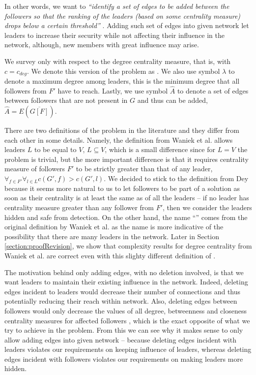 In other words, we want to \emph{``identify a set of edges to be added between the followers so that
the ranking of the leaders (based on some centrality measure) drops below a certain threshold''} \cite{Waniek2017}.
Adding such set of edges into given network let leaders to increase their security while not affecting their
influence in the network, although, new members with great influence may arise.

We survey \HLshort only with respect to the degree centrality measure, that is, with $c = c_{deg}$.
We denote this version of the problem as \HLdeg.
We also use symbol $\lambda$ to denote a maximum degree among leaders, this is the minimum degree that
all followers from $F'$ have to reach.
Lastly, we use symbol $\hat{A}$ to denote a set of edges between followers that are not present in $G$ and thus can be added,
$\hat{A} = E(\overline{G[F]})$.

There are two definitions of the \HL problem in the literature and they differ from each other in some details.
Namely, the definition from Waniek et al. \cite{Waniek2017} allows leaders $L$ to be equal to $V$, $L \subseteq V$,
which is a small difference since for $L = V$ the problem is trivial, but the more important difference is that
it requires centrality measure of followers $F'$ to be strictly greater than that of any leader,
$\forall_{f \in F'} \forall_{l \in L} c(G', f) > c(G', l)$.
We decided to stick to the definition from Dey \cite{Dey2019} because it seems more natural to us to let followers
to be part of a solution as soon as their centrality is at least the same as of all the leaders --
if no leader has centrality measure greater than any follower from $F'$, then
we consider the leaders hidden and safe from detection.
On the other hand, the name ``\HL'' comes from the original definition by Waniek et al. as
the name is more indicative of the possibility that there are many leaders in the network.
Later in Section \ref{section:proofRevision}, we show that complexity results for degree centrality from Waniek et al.
are correct even with this slighty different definition of \HLshort.

The motivation behind only adding edges, with no deletion involved, is that we want leaders to maintain
their existing influence in the network.
Indeed, deleting edges incident to leaders would decrease their number of connections and thus potentially
reducing their reach within network.
Also, deleting edges between followers would only decrease the values of all degree, betweenness and closeness
centrality measures for affected followers \cite{Waniek2016},
which is the exact opposite of what we try to achieve in the \HL problem.
From this we can see why it makes sense to only allow adding edges into given network --
because deleting edges incident with leaders violates our requirements on keeping influence of leaders,
whereas deleting edges incident with followers violates our requirements on making leaders more hidden.


